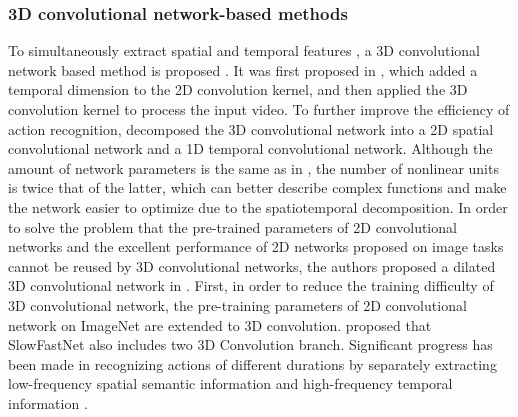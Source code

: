 \documentclass[a4paper]{cas-sc}
\begin{document}
\subsubsection{3D convolutional network-based methods}
To simultaneously extract spatial and temporal features , 
a 3D convolutional network based method is proposed . It was first proposed in \cite{tran2015learning}, 
which added a temporal dimension to the 2D convolution kernel, 
and then applied the 3D convolution kernel to process the input video. To further improve the efficiency of action recognition, 
\cite{tran2018closer} decomposed the 3D convolutional network into a 2D spatial convolutional network and a 1D temporal convolutional network. 
Although the amount of network parameters is the same as in \cite{tran2015learning} , the number of nonlinear units 
is twice that of the latter, 
which can better describe complex functions and make the network easier to optimize due to the spatiotemporal decomposition. 
In order to solve the problem that the pre-trained parameters of 2D convolutional networks and the excellent performance of 2D networks
proposed on image tasks cannot be reused by 3D convolutional networks, 
the authors proposed a dilated 3D convolutional network in \cite{carreira2017quo}. 
First, in order to reduce the training difficulty of 3D convolutional network, 
the pre-training parameters of 2D convolutional network on ImageNet are extended to 3D convolution. 
\cite{feichtenhofer2019slowfast} proposed that SlowFastNet also includes two 3D Convolution branch. 
Significant progress has been made in recognizing actions of different durations by separately extracting low-frequency 
spatial semantic information and high-frequency temporal information .
\end{document}
